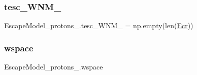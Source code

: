 \subsubsection{\texorpdfstring{tesc\+\_\+\+W\+N\+M\+\_}{tesc\_WNM\_3}}
{\footnotesize\ttfamily Escape\+Model\+\_\+protons\+\_.\+tesc\+\_\+\+W\+N\+M\+\_ = np.\+empty(len(\hyperlink{namespaceEscapeModel__protons__2_a62e66b8006971b0139c21f5fcb089c1d}{Ecr}))}

\mbox{\label{namespaceEscapeModel__protons__2_a65333655f63001669eda448cb221f3c8}} 
\subsubsection{\texorpdfstring{wspace}{wspace}}
{\footnotesize\ttfamily Escape\+Model\+\_\+protons\+\_.\+wspace}

